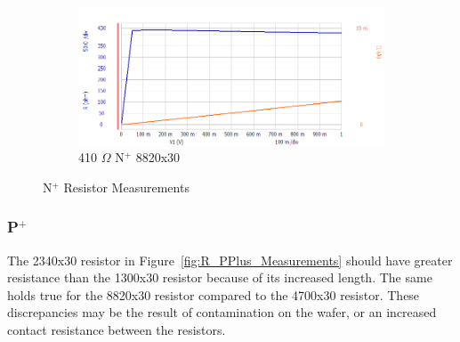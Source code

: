 \documentclass[letter,12pt]{article}
\begin{document}
\begin{figure}[h!]
\begin{subfigure}[b]{.45\textwidth}
					\includegraphics[width=\textwidth]{./Images/Probe_Test/R_NPlus_8820x30.png}
					\caption{410 $\Omega$ N$^+$ 8820x30}
				\end{subfigure}
				\caption{N$^+$ Resistor Measurements}
				\label{fig:R_NPlus_Measurements}
			\end{figure}
		
		\FloatBarrier	
		\subsubsection{P$^+$}
			The 2340x30 resistor in Figure~\ref{fig:R_PPlus_Measurements} should have greater resistance than the 1300x30 resistor because of its increased length.  The same holds true for the 8820x30 resistor compared to the 4700x30 resistor.  These discrepancies may be the result of contamination on the wafer, or an increased contact resistance between the resistors.
			
\end{document}

